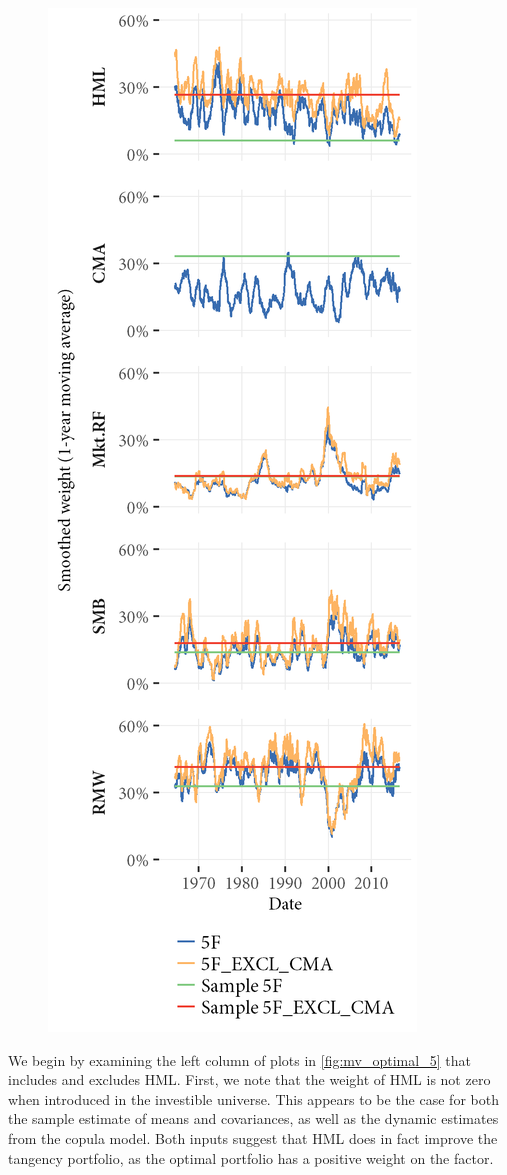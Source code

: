 \begin{figure}[htbp]
  \includegraphics[scale = 1]{graphics/Weights_5F_EXCL_CMA_5F.png}
\end{figure}

We begin by examining the left column of plots in \autoref{fig:mv_optimal_5} that includes and excludes HML. First, we note that the weight of HML is not zero when introduced in the investible universe. This appears to be the case for both the sample estimate of means and covariances, as well as the dynamic estimates from the copula model. Both inputs suggest that HML does in fact improve the tangency portfolio, as the optimal portfolio has a positive weight on the factor. 

